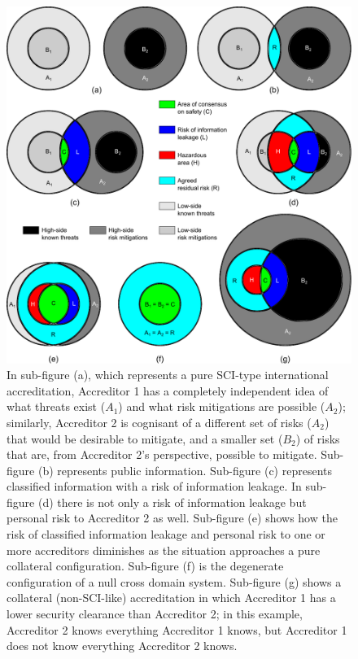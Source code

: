 \documentclass[10pt,letterpaper,conference]{IEEEtran}
\begin{document}
\begin{figure}[!t]
    \centering
	\includegraphics[width=\textwidth,trim=0 0 0 0,clip]{venn_diagrams_for_paper-corrected.pdf}
	\caption{In sub-figure (a), which represents a pure SCI-type international accreditation,
		Accreditor 1 has a completely independent idea of what threats exist ($A_1$) and what
		risk mitigations are possible ($A_2$); similarly, Accreditor 2 is cognisant of a
		different set of risks ($A_2$) that would be desirable to mitigate, and a smaller
		set ($B_2$) of risks that are, from Accreditor 2's perspective, possible to mitigate.
		Sub-figure (b) represents public information.  Sub-figure (c) represents classified
		information with a risk of information leakage.  In sub-figure (d) there is not only
		a risk of information leakage but personal risk to Accreditor 2 as well.  Sub-figure
		(e) shows how the risk of classified information leakage and personal risk to one or
		more accreditors diminishes as the situation approaches a pure collateral configuration.
		Sub-figure (f) is the degenerate configuration of a null cross domain system.
		Sub-figure (g) shows a collateral (non-SCI-like) accreditation in which Accreditor 1
		has a lower security clearance than Accreditor 2; in this example, Accreditor 2 knows
		everything Accreditor 1 knows, but Accreditor 1 does not know everything Accreditor 2
		knows.}
	\label{figure:accreditor-model}
\end{figure}
\end{document}

